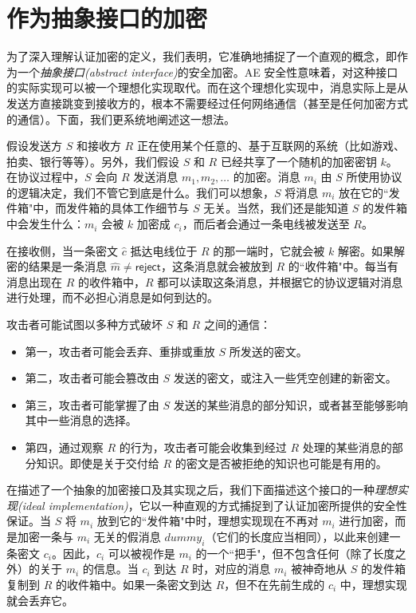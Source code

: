 \section{作为抽象接口的加密}\label{sec:9-3}

为了深入理解认证加密的定义，我们表明，它准确地捕捉了一个直观的概念，即作为一个\emph{抽象接口(abstract interface)}的安全加密。AE 安全性意味着，对这种接口的实际实现可以被一个理想化实现取代。而在这个理想化实现中，消息实际上是从发送方直接跳变到接收方的，根本不需要经过任何网络通信（甚至是任何加密方式的通信）。下面，我们更系统地阐述这一想法。

假设发送方 $S$ 和接收方 $R$ 正在使用某个任意的、基于互联网的系统（比如游戏、拍卖、银行等等）。另外，我们假设 $S$ 和 $R$ 已经共享了一个随机的加密密钥 $k$。在协议过程中，$S$ 会向 $R$ 发送消息 $m_1,m_2,\dots$ 的加密。消息 $m_i$ 由 $S$ 所使用协议的逻辑决定，我们不管它到底是什么。我们可以想象，$S$ 将消息 $m_i$ 放在它的``发件箱"中，而发件箱的具体工作细节与 $S$ 无关。当然，我们还是能知道 $S$ 的发件箱中会发生什么：$m_i$ 会被 $k$ 加密成 $c_i$，而后者会通过一条电线被发送至 $R$。

在接收侧，当一条密文 $\hat{c}$ 抵达电线位于 $R$ 的那一端时，它就会被 $k$ 解密。如果解密的结果是一条消息 $\hat{m}\neq\mathsf{reject}$，这条消息就会被放到 $R$ 的``收件箱"中。每当有消息出现在 $R$ 的收件箱中，$R$ 都可以读取这条消息，并根据它的协议逻辑对消息进行处理，而不必担心消息是如何到达的。

攻击者可能试图以多种方式破坏 $S$ 和 $R$ 之间的通信：
\begin{itemize}
	\item 第一，攻击者可能会丢弃、重排或重放 $S$ 所发送的密文。
	\item 第二，攻击者可能会篡改由 $S$ 发送的密文，或注入一些凭空创建的新密文。
	\item 第三，攻击者可能掌握了由 $S$ 发送的某些消息的部分知识，或者甚至能够影响其中一些消息的选择。
	\item 第四，通过观察 $R$ 的行为，攻击者可能会收集到经过 $R$ 处理的某些消息的部分知识。即使是关于交付给 $R$ 的密文是否被拒绝的知识也可能是有用的。
\end{itemize}

在描述了一个抽象的加密接口及其实现之后，我们下面描述这个接口的一种\emph{理想实现(ideal implementation)}，它以一种直观的方式捕捉到了认证加密所提供的安全性保证。当 $S$ 将 $m_i$ 放到它的``发件箱"中时，理想实现现在不再对 $m_i$ 进行加密，而是加密一条与 $m_i$ 无关的假消息 $\mathit{dummy}_i$（它们的长度应当相同），以此来创建一条密文 $c_i$。因此，$c_i$ 可以被视作是 $m_i$ 的一个``把手"，但不包含任何（除了长度之外）的关于 $m_i$ 的信息。当 $c_i$ 到达 $R$ 时，对应的消息 $m_i$ 被神奇地从 $S$ 的发件箱复制到 $R$ 的收件箱中。如果一条密文到达 $R$，但不在先前生成的 $c_i$ 中，理想实现就会丢弃它。

